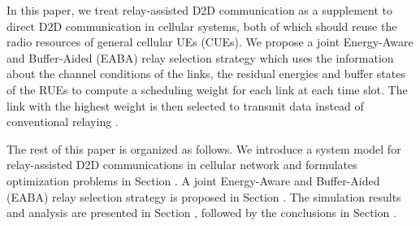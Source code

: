 \documentclass[conference]{IEEEtran}
\begin{document}
In this paper, we treat relay-assisted D2D communication as a supplement to direct D2D communication in cellular systems, both of which should reuse the radio resources of general cellular UEs (CUEs). We propose a joint Energy-Aware and Buffer-Aided (EABA) relay selection strategy which uses the information about the channel conditions of the links, the residual energies and buffer states of the RUEs to compute a scheduling weight for each link at each time slot. The link with the highest weight is then selected to transmit data instead of conventional relaying \cite{7562509}.

The rest of this paper is organized as follows. We introduce a system model for relay-assisted D2D communications in cellular network and formulates optimization problems in Section \uppercase\expandafter{}. A joint Energy-Aware and Buffer-Aided (EABA) relay selection strategy is proposed in Section \uppercase\expandafter{}. The simulation results and analysis are presented in Section \uppercase\expandafter{}, followed by the conclusions in Section \uppercase\expandafter{}.
\end{document}
